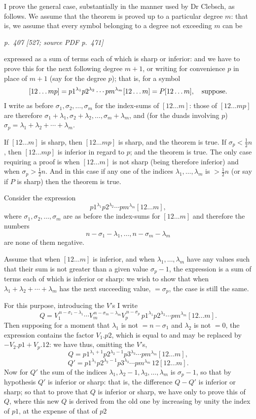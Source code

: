 \documentclass[11pt,a4paper]{article}
\newcommand{\pagemarker}[3]{\par\bigskip\noindent\textit{p.~#1 [#2; source PDF p.~#3]}\par\smallskip}
\begin{document}
I prove the general case, substantially in the manner used by Dr Clebsch, as follows.
We assume that the theorem is proved up to a particular degree $m$: that is, we
assume that every symbol belonging to a degree not exceeding $m$ can be

\pagemarker{407}{527}{471}

expressed as a sum of terms each of which is sharp or inferior: and we have to prove
this for the next following degree $m+1$, or writing for convenience $p$ in place of
$m+1$ (say for the degree $p$); that is, for a symbol
\[
[12\ldots mp]=p1^{\lambda_1}p2^{\lambda_2}\cdots pm^{\lambda_m}[12\ldots m]
=P[12\ldots m],\quad\hbox{suppose.}
\]
I write as before $\sigma_1,\sigma_2,\ldots,\sigma_m$ for the index-sums of
$[12\ldots m]$: those of $[12\ldots mp]$ are therefore
$\sigma_1+\lambda_1,\sigma_2+\lambda_2,\ldots,\sigma_m+\lambda_m$, and (for the
duads involving $p$) $\sigma_p=\lambda_1+\lambda_2+\cdots+\lambda_m$.

If $[12\ldots m]$ is sharp, then $[12\ldots mp]$ is sharp, and the theorem is true.
If $\sigma_p<\frac12n$, then $[12\ldots mp]$ is inferior in regard to $p$; and the theorem
is true. The only case requiring a proof is when $[12\ldots m]$ is not sharp (being
therefore inferior) and when $\sigma_p>\frac12n$. And in this case if any one of the
indices $\lambda_1,\ldots,\lambda_m$ is $>\frac12n$ (or say if $P$ is sharp) then the
theorem is true.

Consider the expression
\[
p1^{\lambda_1}p2^{\lambda_2}\cdots pm^{\lambda_m}[12\ldots m],
\]
where $\sigma_1,\sigma_2,\ldots,\sigma_m$ are as before the index-sums for $[12\ldots m]$
and therefore the numbers
\[
n-\sigma_1-\lambda_1,\ldots,n-\sigma_m-\lambda_m
\]
are none of them negative.

Assume that when $[12\ldots m]$ is inferior, and when
$\lambda_1,\ldots,\lambda_m$ have any values such that their sum is not greater than
a given value $\sigma_p-1$, the expression is a sum of terms each of which is inferior
or sharp: we wish to show that when $\lambda_1+\lambda_2+\cdots+\lambda_m$ has the
next succeeding value, $=\sigma_p$, the case is still the same.

For this purpose, introducing the $V$'s I write
\[
Q=V_1^{\,n-\sigma_1-\lambda_1}\cdots
V_m^{\,n-\sigma_m-\lambda_m}
V_p^{\,n-\sigma_p}\,
p1^{\lambda_1}p2^{\lambda_2}\cdots pm^{\lambda_m}[12\ldots m].
\]
Then supposing for a moment that $\lambda_1$ is not $=n-\sigma_1$ and $\lambda_2$ is
not $=0$, the expression contains the factor $V_1.p2$, which is equal to and may be
replaced by $-V_2.p1+V_p.12$: we have thus, omitting the $V$'s,
\[
Q=p1^{\lambda_1+1}p2^{\lambda_2-1}p3^{\lambda_3}\cdots pm^{\lambda_m}[12\ldots m],
\]
\[
Q'=p1^{\lambda_1}p2^{\lambda_2-1}p3^{\lambda_3}\cdots pm^{\lambda_m}\,12[12\ldots m].
\]
Now for $Q'$ the sum of the indices
$\lambda_1,\lambda_2-1,\lambda_3,\ldots,\lambda_m$ is $\sigma_p-1$, so that by
hypothesis $Q'$ is inferior or sharp: that is, the difference $Q-Q'$ is inferior or
sharp; so that to prove that $Q$ is inferior or sharp, we have only to prove this of
$Q$, where this new $Q$ is derived from the old one by increasing by unity the index
of $p1$, at the expense of that of $p2$
\end{document}
